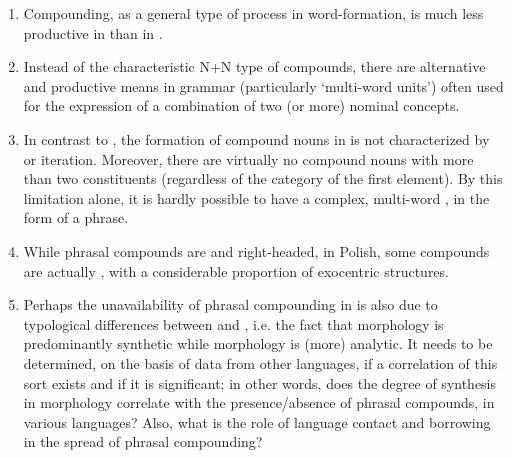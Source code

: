 \documentclass[output=paper]{LSP/langsci}
\begin{document}
\begin{enumerate}
\item Compounding, as a general type of process in word-formation, is much less productive in  than in . 
\item Instead of the characteristic  N+N type of compounds, there are alternative and productive means in  grammar (particularly ‘multi-word units’) often used for the expression of a combination of two (or more) nominal concepts.
\item In contrast to , the formation of compound nouns in  is not characterized by  or iteration. Moreover, there are virtually no compound nouns with more than two constituents (regardless of the category of the first element). By this limitation alone, it is hardly possible to have a complex, multi-word , in the form of a phrase.
\item While  phrasal compounds are  and right-headed, in Polish, some compounds are actually , with a considerable proportion of exocentric structures.
\item Perhaps the unavailability of phrasal compounding in  is also due to typological differences between  and , i.e. the fact that  morphology is predominantly synthetic while  morphology is (more) analytic. It needs to be determined, on the basis of data from other languages, if a correlation of this sort exists and if it is significant; in other words, does the degree of synthesis in morphology correlate with the presence/absence of phrasal compounds, in various languages? Also, what is the role of language contact and borrowing in the spread of phrasal compounding?
\end{enumerate}

{\sloppy
\printbibliography[heading=subbibliography,notkeyword=this]
}
\end{document}
